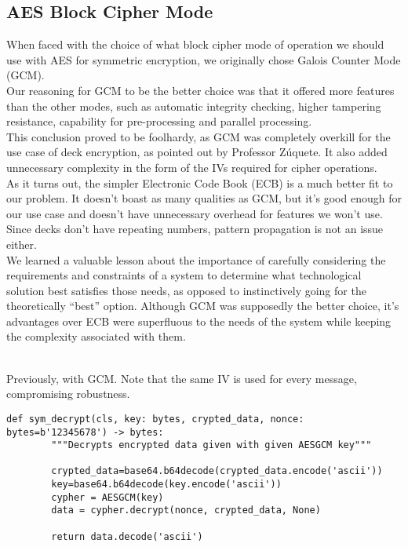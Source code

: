 \documentclass[11pt]{article}
\begin{document}
\subsection{AES Block Cipher Mode}\label{aes block Cipher Mode}
When faced with the choice of what block cipher mode of operation we should use with AES for symmetric encryption, we originally chose Galois Counter Mode (GCM).\\
Our reasoning for GCM to be the better choice was that it offered more features than the other modes, such as automatic integrity checking, higher tampering resistance, capability for pre-processing and parallel processing.\\
This conclusion proved to be foolhardy, as GCM was completely overkill for the use case of deck encryption, as pointed out by Professor Zúquete. It also added unnecessary complexity in the form of the IVs required for cipher operations.\\
As it turns out, the simpler Electronic Code Book (ECB) is a much better fit to our problem. It doesn’t boast as many qualities as GCM, but it’s good enough for our use case and doesn’t have unnecessary overhead for features we won’t use. Since decks don’t have repeating numbers, pattern propagation is not an issue either.\\
We learned a valuable lesson about the importance of carefully considering the requirements and constraints of a system to determine what technological solution best satisfies those needs, as opposed to instinctively going for the theoretically “best” option. Although GCM was supposedly the better choice, it’s advantages over ECB were superfluous to the needs of the system while keeping the complexity associated with them.
\\
\\
\begin{Large}
Previously, with GCM. Note that the same IV is used for every message, compromising robustness.
\end{Large} 
\begin{lstlisting}[captionpos=b label=listing:sparql_getallindividuals,
   basicstyle=\ttfamily]def sym_decrypt(cls, key: bytes, crypted_data, nonce: bytes=b'12345678') -> bytes:
        """Decrypts encrypted data given with given AESGCM key"""

        crypted_data=base64.b64decode(crypted_data.encode('ascii'))
        key=base64.b64decode(key.encode('ascii'))
        cypher = AESGCM(key) 
        data = cypher.decrypt(nonce, crypted_data, None)
         
        return data.decode('ascii')
\end{lstlisting}
\end{document}
